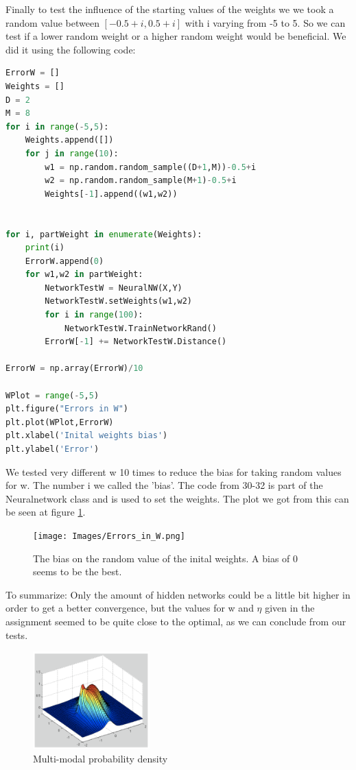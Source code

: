 \documentclass[a4paper]{article}
\begin{document}
Finally to test the influence of the starting values of the weights we we took a random value between $[-0.5+i,0.5+i]$ with i varying from -5 to 5. So we can test if a lower random weight or a higher random weight would be beneficial. We did it using the following code:

\begin{lstlisting}[language=Python]
ErrorW = []
Weights = []
D = 2
M = 8
for i in range(-5,5):
    Weights.append([])
    for j in range(10):
        w1 = np.random.random_sample((D+1,M))-0.5+i
        w2 = np.random.random_sample(M+1)-0.5+i
        Weights[-1].append((w1,w2))


for i, partWeight in enumerate(Weights):
    print(i)
    ErrorW.append(0)
    for w1,w2 in partWeight:
        NetworkTestW = NeuralNW(X,Y)
        NetworkTestW.setWeights(w1,w2)
        for i in range(100):
            NetworkTestW.TrainNetworkRand()
        ErrorW[-1] += NetworkTestW.Distance()

ErrorW = np.array(ErrorW)/10

WPlot = range(-5,5)
plt.figure("Errors in W")
plt.plot(WPlot,ErrorW)
plt.xlabel('Inital weights bias')
plt.ylabel('Error')
\end{lstlisting}

We tested very different w 10 times to reduce the bias for taking random values for w. The number i we called the 'bias'. The code from 30-32 is part of the Neuralnetwork class and is used to set the weights.
The plot we got from this can be seen at figure \ref{WDif}.

\begin{figure}[H]
\texttt{[image: Images/Errors\_in\_W.png]}
\caption{The bias on the random value of the inital weights. A bias of 0 seems to be the best.}
\label{WDif}
\end{figure}

To summarize: Only the amount of hidden networks could be a little bit higher in order to get a better convergence, but the values for w and $\eta$ given in the assignment seemed to be quite close to the optimal, as we can conclude from our tests.


\begin{figure}[H]
\center
\includegraphics[width=0.4\textwidth]{Images/multi-modal.png}
\caption{Multi-modal probability density}
\label{Fig:multi-modal}
\end{figure}
\end{document}
